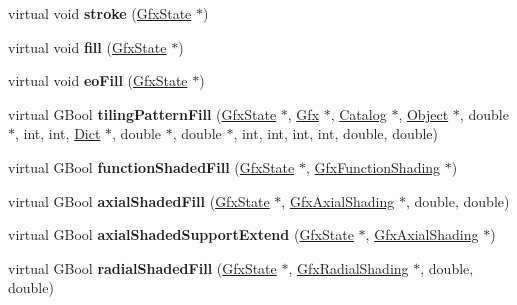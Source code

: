\begin{DoxyCompactItemize}
virtual void {\bfseries stroke} (\hyperlink{class_gfx_state}{Gfx\+State} $\ast$)
\item 
\mbox{\label{class_output_dev_a27be5a4851d168b8e08d52dc32dfc9d9}} 
virtual void {\bfseries fill} (\hyperlink{class_gfx_state}{Gfx\+State} $\ast$)
\item 
\mbox{\label{class_output_dev_a33a36bcae0a743b6182f73e50abc4c41}} 
virtual void {\bfseries eo\+Fill} (\hyperlink{class_gfx_state}{Gfx\+State} $\ast$)
\item 
\mbox{\label{class_output_dev_af51488d09f76b2f06bdd4b332c602c8c}} 
virtual G\+Bool {\bfseries tiling\+Pattern\+Fill} (\hyperlink{class_gfx_state}{Gfx\+State} $\ast$, \hyperlink{class_gfx}{Gfx} $\ast$, \hyperlink{class_catalog}{Catalog} $\ast$, \hyperlink{class_object}{Object} $\ast$, double $\ast$, int, int, \hyperlink{class_dict}{Dict} $\ast$, double $\ast$, double $\ast$, int, int, int, int, double, double)
\item 
\mbox{\label{class_output_dev_ab07903de11eb3ee7406eb688d609ec07}} 
virtual G\+Bool {\bfseries function\+Shaded\+Fill} (\hyperlink{class_gfx_state}{Gfx\+State} $\ast$, \hyperlink{class_gfx_function_shading}{Gfx\+Function\+Shading} $\ast$)
\item 
\mbox{\label{class_output_dev_a8b296e1a5cf43432101c59b67af4128a}} 
virtual G\+Bool {\bfseries axial\+Shaded\+Fill} (\hyperlink{class_gfx_state}{Gfx\+State} $\ast$, \hyperlink{class_gfx_axial_shading}{Gfx\+Axial\+Shading} $\ast$, double, double)
\item 
\mbox{\label{class_output_dev_af18b529a68d2b5d5948cbc0c4e8330c4}} 
virtual G\+Bool {\bfseries axial\+Shaded\+Support\+Extend} (\hyperlink{class_gfx_state}{Gfx\+State} $\ast$, \hyperlink{class_gfx_axial_shading}{Gfx\+Axial\+Shading} $\ast$)
\item 
\mbox{\label{class_output_dev_a5f7d9ce5c0580f38955e5dc10d8b435e}} 
virtual G\+Bool {\bfseries radial\+Shaded\+Fill} (\hyperlink{class_gfx_state}{Gfx\+State} $\ast$, \hyperlink{class_gfx_radial_shading}{Gfx\+Radial\+Shading} $\ast$, double, double)
\item 
\mbox{\label{class_output_dev_ad2596d7dfbfd19b8bf375d23e826663e}} 

\end{DoxyCompactItemize}
